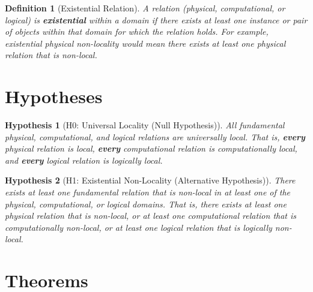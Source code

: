 \documentclass{article}
\newtheorem{definition}{Definition}
\newtheorem{hypothesis}{Hypothesis}
\begin{document}
	\begin{definition}[Existential Relation]
		A relation (physical, computational, or logical) is \textbf{existential} within a domain if there exists at least one instance or pair of objects within that domain for which the relation holds. For example, existential physical non-locality would mean there exists at least one physical relation that is non-local.
	\end{definition}
	
	\section{Hypotheses}
	
	\begin{hypothesis}[H0: Universal Locality (Null Hypothesis)]
		All fundamental physical, computational, and logical relations are universally local. That is, \textbf{every} physical relation is local, \textbf{every} computational relation is computationally local, and \textbf{every} logical relation is logically local.
	\end{hypothesis}
	
	\begin{hypothesis}[H1: Existential Non-Locality (Alternative Hypothesis)]
		There exists at least one fundamental relation that is non-local in at least one of the physical, computational, or logical domains. That is, there exists at least one physical relation that is non-local, or at least one computational relation that is computationally non-local, or at least one logical relation that is logically non-local.
	\end{hypothesis}
	
	\section{Theorems}
	
\end{document}
